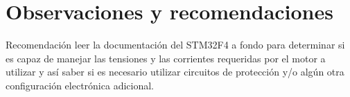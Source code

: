 \documentclass[letterpaper]{article}
\begin{document}
\section{Observaciones y recomendaciones}
Recomendación leer la documentación del STM32F4 a fondo para determinar si es capaz de manejar las tensiones y las corrientes 
requeridas por el motor a utilizar y así saber si es necesario utilizar circuitos de protección y/o algún otra configuración
electrónica adicional.

 


%


\end{document}
